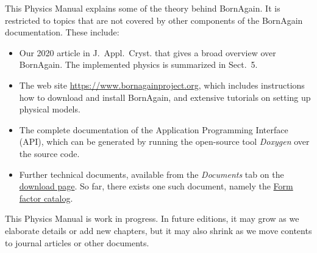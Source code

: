 This Physics Manual explains some of the theory behind BornAgain.
It is restricted to topics that are not covered by other components
of the BornAgain documentation.
These include:
\begin{itemize}
\item Our 2020 article in J.~Appl.\ Cryst. \cite{PoVB20}
that gives a broad overview over BornAgain.
The implemented physics is summarized in Sect.~5.
\item {}
The web site \url{https://www.bornagainproject.org},
which includes instructions how to download and install BornAgain,
and extensive tutorials on setting up physical models.
\item {}
The complete documentation of the Application Programming Interface (API),
which can be generated by running 
the open-source tool \emph{Doxygen} over the source code.
\item Further technical documents,
available from the \emph{Documents} tab on the
\href{https://www.bornagainproject.org/download#Documents}{download page}.
So far, there exists one such document, namely the
\href{http://apps.jcns.fz-juelich.de/src/BornAgain/FFCatalog.pdf}{Form factor catalog}.
\end{itemize}
This Physics Manual is work in progress.
In future editions, it may grow as we elaborate details or add new chapters,
but it may also shrink as we move contents to journal articles or other documents.


